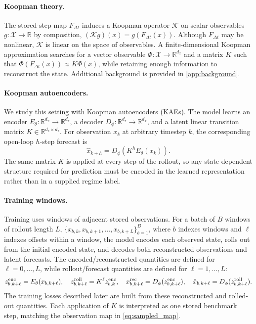 \documentclass[11pt]{article}
\newcommand{\R}{\mathbb{R}}
\newcommand{\Enc}{E_\theta}
\newcommand{\Dec}{D_\phi}
\begin{document}
\paragraph{Koopman theory.} The stored-step map \(F_{\Delta t}\) induces a Koopman operator \(\mathcal K\) on scalar observables \(g:\mathcal X\to\R\) by composition, \((\mathcal K g)(x)=g(F_{\Delta t}(x))\). Although \(F_{\Delta t}\) may be nonlinear, \(\mathcal K\) is linear on the space of observables. A finite-dimensional Koopman approximation searches for a vector observable \(\Phi:\mathcal X\to\R^{d_z}\) and a matrix \(K\) such that \(\Phi(F_{\Delta t}(x))\approx K\Phi(x)\), while retaining enough information to reconstruct the state. Additional background is provided in \cref{app:background}.


\paragraph{Koopman autoencoders.} We study this setting with Koopman autoencoders (KAEs). The model learns an encoder $\Enc:\R^{d_x}\rightarrow\R^{d_z}$, a decoder $\Dec:\R^{d_z}\rightarrow\R^{d_x}$, and a latent linear transition matrix $K\in\R^{d_z\times d_z}$. For observation $x_k$ at arbitrary timestep $k$, the corresponding open-loop $h$-step forecast is
\begin{equation}
  \hat x_{k+h}=\Dec\!\left(K^h\Enc(x_k)\right).
  \label{eq:kae_forecast}
\end{equation}
The same matrix $K$ is applied at every step of the rollout, so any state-dependent structure required for prediction must be encoded in the learned representation rather than in a supplied regime label.

\paragraph{Training windows.} Training uses windows of adjacent stored observations. For a batch of $B$ windows of rollout length $L$,
$\{x_{b,k},x_{b,k+1},\ldots,x_{b,k+L}\}_{b=1}^{B}$, where $b$ indexes windows and $\ell$ indexes offsets within a window, the model encodes each observed state, rolls out from the initial encoded state, and decodes both reconstructed observations and latent forecasts. The encoded/reconstructed quantities are defined for $\ell=0,\ldots,L$, while rollout/forecast quantities are defined for $\ell=1,\ldots,L$:
\begin{equation}
\begin{aligned}
  z_{b,k+\ell}^{\rm enc} = \Enc(x_{b,k+\ell}),\quad
  z_{b,k+\ell}^{\rm roll}=K^\ell z_{b,k}^{\rm enc},\quad
  x_{b,k+\ell}^{\rm rec} = \Dec(z_{b,k+\ell}^{\rm enc}),\quad
  \hat x_{b,k+\ell}=\Dec(z_{b,k+\ell}^{\rm roll}).
\end{aligned}
\label{eq:window_rollout}
\end{equation}
The training losses described later are built from these reconstructed and rolled-out quantities. Each application of $K$ is interpreted as one stored benchmark step, matching the observation map in \cref{eq:sampled_map}.
\end{document}

